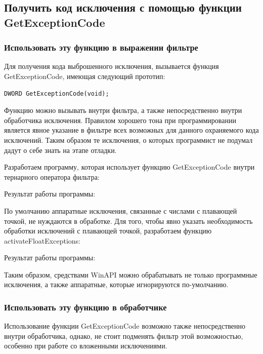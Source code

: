 \documentclass[14pt,a4paper,report]{report}
\begin{document}
\subsection{Получить код исключения с помощью функции GetExceptionCode}

\subsubsection{Использовать эту функцию в выражении фильтре}

Для получения кода выброшенного исключения, вызывается функция GetExceptionCode, имеющая следующий прототип:

\begin{lstlisting}
DWORD GetExceptionCode(void);
\end{lstlisting}

Функцию можно вызывать внутри фильтра, а также непосредственно внутри обработчика исключения. Правилом хорошего тона при программировании является явное указание в фильтре всех возможных для данного охраняемого кода исключений. Таким образом те исключения, о которых программист не подумал дадут о себе знать на этапе отладки.

Разработаем программу, которая использует функцию GetExceptionCode внутри тернарного оператора фильтра:



Результат работы программы:



По умолчанию аппаратные исключения, связанные с числами с плавающей точкой, не нуждаются в обработке. Для того, чтобы явно указать необходимость обработки исключений с плавающей точкой, разработаем функцию activateFloatExceptions:



Результат работы программы:



Таким образом, средствами WinAPI можно обрабатывать не только программные исключения, а также аппаратные, которые игнорируются по-умолчанию.

\subsubsection{Использовать эту функцию в обработчике}

Использование функции GetExceptionCode возможно также непосредственно внутри обработчика, однако, не стоит подменять фильтр этой возможностью, особенно при работе со вложенными исключениями.
\end{document}
